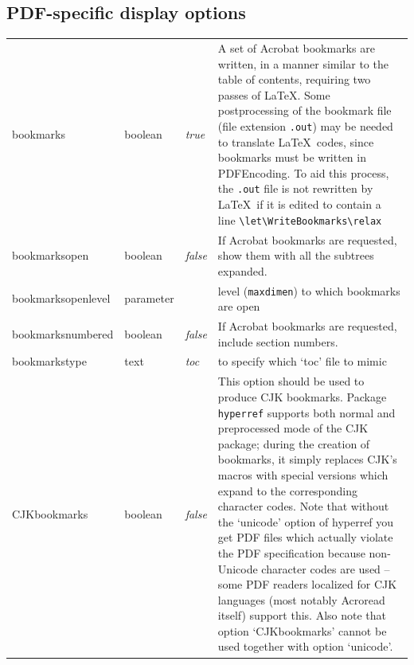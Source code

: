 \documentclass[pdftex]{article}
\newcommand{\bs}{\symbol{'134}}%
\newcommand{\ci}[1]{\texttt{\bs#1}}
\begin{document}
\subsection{PDF-specific display options}
\noindent\begin{longtable}{@{}>{\ttfamily}ll>{\itshape}lp{7.5cm}@{}}
bookmarks          & boolean   & true   & A set of Acrobat bookmarks are written, in a manner similar to the
                                           table of contents, requiring two passes of \LaTeX. Some postprocessing
                                           of the bookmark file (file extension \texttt{.out}) may be needed to
                                           translate \LaTeX\ codes, since bookmarks must be written in  PDFEncoding.
                                           To aid this  process, the \texttt{.out} file is not rewritten by \LaTeX\
                                           if it is edited to contain a line \verb|\let\WriteBookmarks\relax| \\
bookmarksopen      & boolean   & false   & If Acrobat bookmarks are requested, show them with all the subtrees
                                           expanded. \\
bookmarksopenlevel & parameter &         & level (\ci{maxdimen}) to which bookmarks are open \\
bookmarksnumbered  & boolean   & false   & If Acrobat bookmarks are requested, include section numbers. \\
bookmarkstype      & text      & toc     & to specify which `toc' file to mimic \\
CJKbookmarks       & boolean   & false   &
    This option should be used to produce CJK bookmarks.
    Package \verb|hyperref|
    supports both normal and preprocessed mode of the CJK package;
    during the creation of bookmarks, it simply replaces CJK's macros
    with special versions which expand to the corresponding character
    codes.  Note that without the `unicode' option of hyperref you get
    PDF files which actually violate the PDF specification because
    non-Unicode character codes are used -- some PDF readers localized
    for CJK languages (most notably Acroread itself) support this.
    Also note that option `CJKbookmarks' cannot be used together
    with option `unicode'.


\end{longtable}
\end{document}
